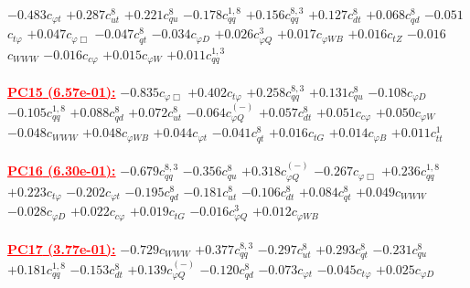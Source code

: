 \documentclass{article}
\begin{document}
{$-0.483$}{\rm $c_{\varphi t}$} 
{$+0.287$}{\rm $c_{ut}^{8}$} 
{$+0.221$}{\rm $c_{qu}^{8}$} 
{$-0.178$}{\rm $c_{qq}^{1,8}$} 
{$+0.156$}{\rm $c_{qq}^{8,3}$} 
{$+0.127$}{\rm $c_{dt}^{8}$} 
{$+0.068$}{\rm $c_{qd}^{8}$} 
{$-0.051$}{\rm $c_{t \varphi}$} 
{$+0.047$}{\rm $c_{\varphi \Box}$} 
{$-0.047$}{\rm $c_{qt}^{8}$} 
{$-0.034$}{\rm $c_{\varphi D}$} 
{$+0.026$}{\rm $c_{\varphi Q}^{3}$} 
{$+0.017$}{\rm $c_{\varphi WB}$} 
{$+0.016$}{\rm $c_{tZ}$} 
{$-0.016$}{\rm $c_{WWW}$} 
{$-0.016$}{\rm $c_{c \varphi}$} 
{$+0.015$}{\rm $c_{\varphi W}$} 
{$+0.011$}{\rm $c_{qq}^{1,3}$} 
 \nonumber \\ \nonumber \\ 
\noindent \textcolor{red}{\underline{\bf{PC15} (6.57e-01):}}
{$-0.835$}{\rm $c_{\varphi \Box}$} 
{$+0.402$}{\rm $c_{t \varphi}$} 
{$+0.258$}{\rm $c_{qq}^{8,3}$} 
{$+0.131$}{\rm $c_{qu}^{8}$} 
{$-0.108$}{\rm $c_{\varphi D}$} 
{$-0.105$}{\rm $c_{qq}^{1,8}$} 
{$+0.088$}{\rm $c_{qd}^{8}$} 
{$+0.072$}{\rm $c_{ut}^{8}$} 
{$-0.064$}{\rm $c_{\varphi Q}^{(-)}$} 
{$+0.057$}{\rm $c_{dt}^{8}$} 
{$+0.051$}{\rm $c_{c \varphi}$} 
{$+0.050$}{\rm $c_{\varphi W}$} 
{$-0.048$}{\rm $c_{WWW}$} 
{$+0.048$}{\rm $c_{\varphi WB}$} 
{$+0.044$}{\rm $c_{\varphi t}$} 
{$-0.041$}{\rm $c_{qt}^{8}$} 
{$+0.016$}{\rm $c_{tG}$} 
{$+0.014$}{\rm $c_{\varphi B}$} 
{$+0.011$}{\rm $c_{tt}^{1}$} 
 \nonumber \\ \nonumber \\ 
\noindent \textcolor{red}{\underline{\bf{PC16} (6.30e-01):}}
{$-0.679$}{\rm $c_{qq}^{8,3}$} 
{$-0.356$}{\rm $c_{qu}^{8}$} 
{$+0.318$}{\rm $c_{\varphi Q}^{(-)}$} 
{$-0.267$}{\rm $c_{\varphi \Box}$} 
{$+0.236$}{\rm $c_{qq}^{1,8}$} 
{$+0.223$}{\rm $c_{t \varphi}$} 
{$-0.202$}{\rm $c_{\varphi t}$} 
{$-0.195$}{\rm $c_{qd}^{8}$} 
{$-0.181$}{\rm $c_{ut}^{8}$} 
{$-0.106$}{\rm $c_{dt}^{8}$} 
{$+0.084$}{\rm $c_{qt}^{8}$} 
{$+0.049$}{\rm $c_{WWW}$} 
{$-0.028$}{\rm $c_{\varphi D}$} 
{$+0.022$}{\rm $c_{c \varphi}$} 
{$+0.019$}{\rm $c_{tG}$} 
{$-0.016$}{\rm $c_{\varphi Q}^{3}$} 
{$+0.012$}{\rm $c_{\varphi WB}$} 
 \nonumber \\ \nonumber \\ 
\noindent \textcolor{red}{\underline{\bf{PC17} (3.77e-01):}}
{$-0.729$}{\rm $c_{WWW}$} 
{$+0.377$}{\rm $c_{qq}^{8,3}$} 
{$-0.297$}{\rm $c_{ut}^{8}$} 
{$+0.293$}{\rm $c_{qt}^{8}$} 
{$-0.231$}{\rm $c_{qu}^{8}$} 
{$+0.181$}{\rm $c_{qq}^{1,8}$} 
{$-0.153$}{\rm $c_{dt}^{8}$} 
{$+0.139$}{\rm $c_{\varphi Q}^{(-)}$} 
{$-0.120$}{\rm $c_{qd}^{8}$} 
{$-0.073$}{\rm $c_{\varphi t}$} 
{$-0.045$}{\rm $c_{t \varphi}$} 
{$+0.025$}{\rm $c_{\varphi D}$} 
\end{document}
